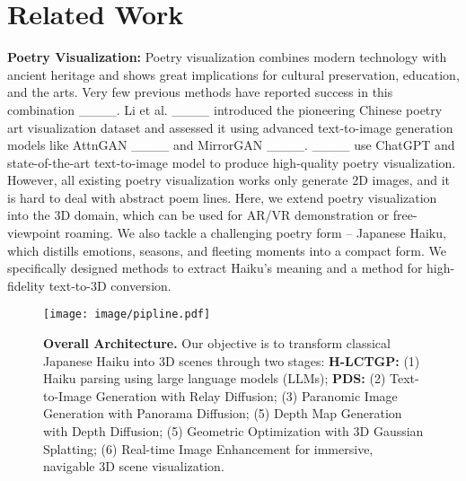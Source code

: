 \section{Related Work}
\noindent\textbf{Poetry Visualization:}
    Poetry visualization combines modern technology with ancient heritage and shows great implications for cultural preservation, education, and the arts. Very few previous methods have reported success in this combination ____. Li et al. ____ introduced the pioneering Chinese poetry art visualization dataset and assessed it using advanced text-to-image generation models like AttnGAN ____ and MirrorGAN ____. ____ use ChatGPT and state-of-the-art text-to-image model to produce high-quality poetry visualization. However, all existing poetry visualization works only generate 2D images, and it is hard to deal with abstract poem lines. Here, we extend poetry visualization into the 3D domain, which can be used for AR/VR demonstration or free-viewpoint roaming. We also tackle a challenging poetry form -- Japanese Haiku, which distills emotions, seasons, and fleeting moments into a compact form. We specifically designed methods to extract Haiku's meaning and a method for high-fidelity text-to-3D conversion.

\begin{figure*}[htbp]
\centering
\texttt{[image: image/pipline.pdf]}
\vspace{-0.3cm}
\caption{\textbf{Overall Architecture.} Our objective is to transform classical Japanese Haiku into 3D scenes through two stages: \textbf{H-LCTGP:} (1) Haiku parsing using large language models (LLMs); \textbf{PDS:} (2) Text-to-Image Generation with Relay Diffusion; (3) Paranomic Image Generation with Panorama Diffusion; (5) Depth Map Generation with Depth Diffusion; (5) Geometric Optimization with 3D Gaussian Splatting; (6) Real-time Image Enhancement for immersive, navigable 3D scene visualization.} 
\label{pipline}
\end{figure*}

